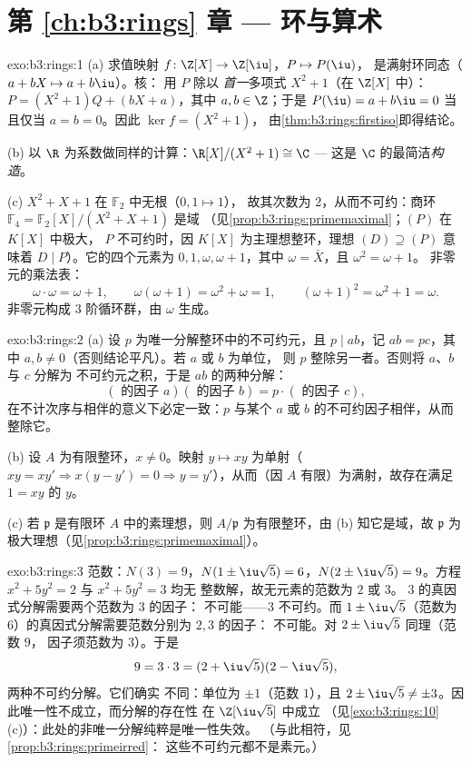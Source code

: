 \section*{第 \ref{ch:b3:rings} 章 --- 环与算术}

\begin{solution}{exo:b3:rings:1}
(a) 求值映射 $f \colon \Z[X] \to \Z[\iu]$，$P \mapsto P(\iu)$，
是满射环同态（$a + bX \mapsto a + b\iu$）。核：
用 $P$ 除以 \emph{首一}多项式 $X^2 + 1$（在 $\Z[X]$ 中）：$P = (X^2 +
1)Q + (bX + a)$，其中 $a, b \in \Z$；于是 $P(\iu) = a + b\iu = 0$
当且仅当 $a = b = 0$。因此 $\ker f = (X^2+1)$，
由\cref{thm:b3:rings:firstiso}即得结论。

(b) 以 $\R$ 为系数做同样的计算：$\R[X]/(X^2+1)
\cong \C$ --- 这是 $\C$ 的最简洁\emph{构造}。

(c) $X^2 + X + 1$ 在 $\mathbb F_2$ 中无根（$0, 1 \mapsto 1$），
故其次数为 $2$，从而不可约：商环 $\mathbb
F_4 = \mathbb F_2[X]/(X^2+X+1)$ 是域
（见\cref{prop:b3:rings:primemaximal}；$(P)$ 在 $K[X]$ 中极大，
$P$ 不可约时，因 $K[X]$ 为主理想整环，理想 $(D) \supseteq
(P)$ 意味着 $D \mid P$）。它的四个元素为 $0, 1, \omega,
\omega + 1$，其中 $\omega = \bar X$，且 $\omega^2 = \omega + 1$。
非零元的乘法表：
\[
\omega \cdot \omega = \omega + 1, \qquad
\omega(\omega + 1) = \omega^2 + \omega = 1, \qquad
(\omega+1)^2 = \omega^2 + 1 = \omega .
\]
非零元构成 $3$ 阶循环群，由
$\omega$ 生成。
\end{solution}

\begin{solution}{exo:b3:rings:2}
(a) 设 $p$ 为唯一分解整环中的不可约元，且 $p \mid ab$，记 $ab =
pc$，其中 $a, b \neq 0$（否则结论平凡）。若 $a$ 或 $b$ 为单位，
则 $p$ 整除另一者。否则将 $a$、$b$ 与 $c$ 分解为
不可约元之积，于是 $ab$ 的两种分解：
\[
(\text{ 的因子 } a)(\text{ 的因子 } b) = p \cdot
(\text{ 的因子 } c),
\]
在不计次序与相伴的意义下必定一致：$p$ 与某个
$a$ 或 $b$ 的不可约因子相伴，从而整除它。

(b) 设 $A$ 为有限整环，$x \neq 0$。映射 $y \mapsto
xy$ 为单射（$xy = xy' \Rightarrow x(y - y') = 0 \Rightarrow
y = y'$），从而（因 $A$ 有限）为满射，故存在满足 $1 = xy$ 的 $y$。

(c) 若 $\mathfrak p$ 是有限环 $A$ 中的素理想，则
$A/\mathfrak p$ 为有限整环，由 (b) 知它是域，故
$\mathfrak p$ 为极大理想（见\cref{prop:b3:rings:primemaximal}）。
\end{solution}

\begin{solution}{exo:b3:rings:3}
范数：$N(3) = 9$，$N(1 \pm \iu\sqrt5) = 6$，$N(2 \pm \iu\sqrt5) =
9$。方程 $x^2 + 5y^2 = 2$ 与 $x^2 + 5y^2 = 3$ 均无
整数解，故无元素的范数为 $2$ 或 $3$。
$3$ 的真因式分解需要两个范数为 $3$ 的因子：
不可能——$3$ 不可约。而 $1
\pm \iu\sqrt5$（范数为 $6$）的真因式分解需要范数分别为 $2, 3$ 的因子：
不可能。对 $2 \pm \iu\sqrt5$ 同理（范数 $9$，
因子须范数为 $3$）。于是
\[
9 = 3 \cdot 3 = (2 + \iu\sqrt5)(2 - \iu\sqrt5),
\]
两种不可约分解。它们确实
不同：单位为 $\pm 1$（范数 $1$），且 $2 \pm \iu\sqrt5
\neq \pm 3$。因此唯一性不成立，而分解的存在性
在 $\Z[\iu\sqrt5]$ 中成立
（见\cref{exo:b3:rings:10}(c)）：此处的非唯一分解纯粹是唯一性失效。
（与此相符，见\cref{prop:b3:rings:primeirred}：
这些不可约元都不是素元。）
\end{solution}

